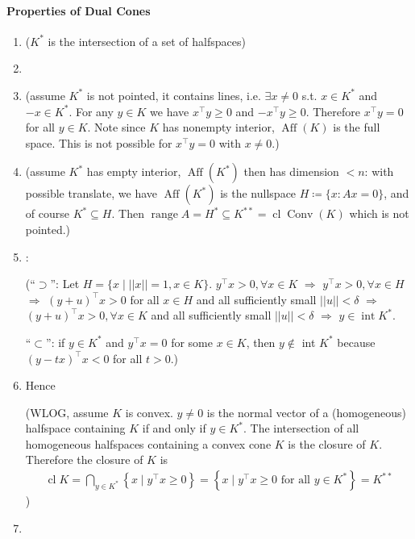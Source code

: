 \documentclass{article}
\newcommand{\Conv}{\operatorname{Conv}}
\newcommand{\cl}{\operatorname{cl}}
\newcommand{\inte}{\operatorname{int}}
\newcommand{\Aff}{\operatorname{Aff}}
\begin{document}
\paragraph{Properties of Dual Cones}\label{sec:pr_du_con}
\begin{enumerate}
    \item {}
    
    ($K^*$ is the intersection of a set of halfspaces)
    \item {}
    \item  {}
        
        (assume $K^{*}$ is not pointed, it contains lines, i.e. $\exists x\ne 0$ s.t. $x \in K^{*}$ and $-x \in K^{*}$. For any $y\in K$ we have $x^{\top}y\ge 0$ and $-x^{\top}y\ge 0$. Therefore $x^{\top}y= 0$ for all $y\in K$. Note since $K$ has nonempty interior, $\Aff (K)$ is the full space. This is not possible for  $x^{\top}y= 0$ with $x\ne 0$.)
    \item {}
    
        (assume  $K^{*}$ has empty interior,  $\Aff (K^{*})$ then has dimension $<n$: with possible translate, we have $\Aff (K^{*})$ is the nullspace $H\coloneqq\{x: Ax=0\}$, and of course $K^{*}\subseteq H$. Then $\operatorname{range}A=H^*\subseteq K^{**}=\cl \Conv(K)$ which is not pointed.)
    \item \tb{$\inte K^{*}=\left\{y \mid y^{\top} x>0\text{ for all }x \in K, x\ne 0\right\}$}:
    
 (``$\supset$'': Let $H=\{x\mid ||x||=1,x \in K\}$.  $y^{\top} x>0,\forall x \in K$ $\Rightarrow$ $y^{\top} x>0,\forall x\in H$ $\Rightarrow$ $(y+u)^{\top} x>0$ for all $x \in H$ and all sufficiently small $||u||<\delta$ $\Rightarrow$ $(y+u)^{\top} x>0,\forall x\in K$ and all sufficiently small $||u||<\delta$ $\Rightarrow$ $y \in \inte K^*$.
 
``$\subset$'':  if $y \in K^{*}$ and $y^{\top} x=0$ for some $x \in K$, then $y \notin$ int $K^{*}$ because $(y-t x)^{\top} x<0$ for all $t>0$.)
    \item {}
    
    Hence 
    
    (WLOG, assume $K$ is convex. $y \neq 0$ is the normal vector of a (homogeneous) halfspace containing $K$ if and only if $y \in K^{*}$. The intersection of all homogeneous halfspaces containing a convex cone $K$ is the closure of $K .$ Therefore the closure of $K$ is
\begin{align*}
\operatorname{cl} K=\bigcap_{y \in K^{*}}\left\{x \mid y^{\top} x \geq 0\right\}=\left\{x \mid y^{\top} x \geq 0 \text { for all } y \in K^{*}\right\}=K^{* *}
\end{align*})
 
    
\item {}
\end{enumerate}
\end{document}
